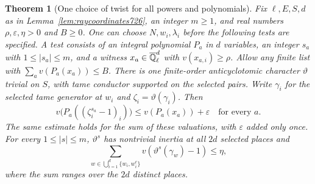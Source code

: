 \documentclass[a4paper,11pt]{article}
\newtheorem{theorem}[proposition]{Theorem}
\theoremstyle{definition}
\theoremstyle{remark}
\numberwithin{equation}{section}
\begin{document}
\begin{theorem}[One choice of twist for all powers and polynomials]
\leavevmode\label{thm:allraypowers726}
Fix \(\ell,E,S,d\) as in Lemma~\ref{lem:raycoordinates726}, an integer
\(m\ge1\), and real numbers \(\rho,\varepsilon,\eta>0\) and \(B\ge0\).
One can choose \(N,w_i,\lambda_i\) before the following tests are
specified. A test consists of an integral polynomial \(P_a\) in \(d\)
variables, an integer \(s_a\) with \(1\le |s_a|\le m\), and a witness
\(x_a\in\overline{\mathbb Q}_\ell^d\) with \(v(x_{a,i})\ge\rho\).
Allow any finite list with \(\sum_a v(P_a(x_a))\le B\).
There is one finite-order anticyclotomic character \(\vartheta\) trivial
on \(S\), with tame conductor supported on the selected pairs. Write
\(\gamma_i\) for the selected tame generator at \(w_i\) and \(\zeta_i
=\vartheta(\gamma_i)\). Then
\[
 v\bigl(P_a((\zeta_i^{s_a}-1)_i)\bigr)
                      \le v(P_a(x_a))+\varepsilon
                       \quad\text{for every }a.
\]
The same estimate holds for the sum of these valuations, with
\(\varepsilon\) added only once. For every \(1\le |s|\le m\),
\(\vartheta^s\) has nontrivial inertia at all \(2d\) selected places and
\[
             \sum_{w\in\bigcup_{i=1}^d\{w_i,w_i^c\}} v(\vartheta^s(\gamma_w)-1)
                                \le \eta ,
\]
where the sum ranges over the \(2d\) distinct places.
\end{theorem}
\end{document}
